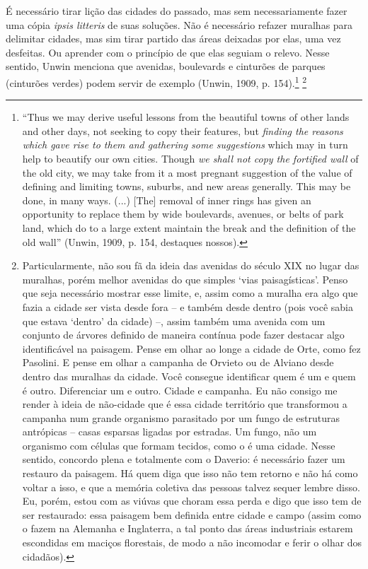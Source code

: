 \documentclass[12pt, a4paper]{book} %
\begin{document}
        É necessário tirar lição das cidades do passado, mas sem necessariamente fazer uma cópia \textit{ipsis litteris} de suas soluções. Não é necessário refazer muralhas para delimitar cidades, mas sim tirar partido das áreas deixadas por elas, uma vez desfeitas. Ou aprender com o princípio de que elas seguiam o relevo. Nesse sentido, Unwin menciona que avenidas, boulevards e cinturões de parques (cinturões verdes) podem servir de exemplo (Unwin, 1909, p. 154).\footnote[51]{``Thus we may derive useful lessons from the beautiful towns of other lands and other days, not seeking to copy their features, but \textit{finding the reasons which gave rise to them and gathering some suggestions} which may in turn help to beautify our own cities. Though \textit{we shall not copy the fortified wall} of the old city, we may take from it a most pregnant suggestion of the value of defining and limiting towns, suburbs, and new areas generally. This may be done, in many ways. (...) [The] removal of inner rings has given an opportunity to replace them by wide boulevards, avenues, or belts of park land, which do to a large extent maintain the break and the definition of the old wall'' (Unwin, 1909, p. 154, destaques nossos).} \footnote[52]{Particularmente, não sou fã da ideia das avenidas do século XIX no lugar das muralhas, porém melhor avenidas do que simples `vias paisagísticas'. Penso que seja necessário mostrar esse limite, e, assim como a muralha era algo que fazia a cidade ser vista desde fora – e também desde dentro (pois você sabia que estava `dentro' da cidade) –, assim também uma avenida com um conjunto de árvores definido de maneira contínua pode fazer destacar algo identificável na paisagem. Pense em olhar ao longe a cidade de Orte, como fez Pasolini. E pense em olhar a campanha de Orvieto ou de Alviano desde dentro das muralhas da cidade. Você consegue identificar quem é um e quem é outro. Diferenciar um e outro. Cidade e campanha. Eu não consigo me render à ideia de não-cidade que é essa cidade território que transformou a campanha num grande organismo parasitado por um fungo de estruturas antrópicas – casas esparsas ligadas por estradas. Um fungo, não um organismo com células que formam tecidos, como o é uma cidade. Nesse sentido, concordo plena e totalmente com o Daverio: é necessário fazer um restauro da paisagem. Há quem diga que isso não tem retorno e não há como voltar a isso, e que a memória coletiva das pessoas talvez sequer lembre disso. Eu, porém, estou com as viúvas que choram essa perda e digo que isso tem de ser restaurado: essa paisagem bem definida entre cidade e campo (assim como o fazem na Alemanha e Inglaterra, a tal ponto das áreas industriais estarem escondidas em maciços florestais, de modo a não incomodar e ferir o olhar dos cidadãos).}
\end{document}
